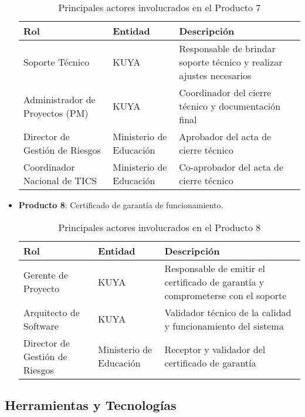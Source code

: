 \begin{itemize}
    \begin{table}[h]
        \centering
        \begin{tabular}{|p{3cm}|p{5cm}|p{7cm}|}
            \hline
            \textbf{Rol} & \textbf{Entidad} & \textbf{Descripción} \\
            \hline
            Soporte Técnico & KUYA & Responsable de brindar soporte técnico y realizar ajustes necesarios \\
            \hline
            Administrador de Proyectos (PM) & KUYA & Coordinador del cierre técnico y documentación final \\
            \hline
            Director de Gestión de Riesgos & Ministerio de Educación & Aprobador del acta de cierre técnico \\
            \hline
            Coordinador Nacional de TICS & Ministerio de Educación & Co-aprobador del acta de cierre técnico \\
            \hline
        \end{tabular}
        \caption{Principales actores involucrados en el Producto 7}
        \label{tab:actores_producto7}
    \end{table}
    \item \textbf{Producto 8}: Certificado de garantía de funcionamiento.
    \begin{table}[ht]
        \centering
        \begin{tabular}{|p{3cm}|p{5cm}|p{7cm}|}
            \hline
            \textbf{Rol} & \textbf{Entidad} & \textbf{Descripción} \\
            \hline
            Gerente de Proyecto & KUYA & Responsable de emitir el certificado de garantía y comprometerse con el soporte \\
            \hline
            Arquitecto de Software & KUYA & Validador técnico de la calidad y funcionamiento del sistema \\
            \hline
            Director de Gestión de Riesgos & Ministerio de Educación & Receptor y validador del certificado de garantía \\
            \hline
        \end{tabular}
        \caption{Principales actores involucrados en el Producto 8}
        \label{tab:actores_producto8}
    \end{table}
\end{itemize}
\subsection{Herramientas y Tecnologías}
